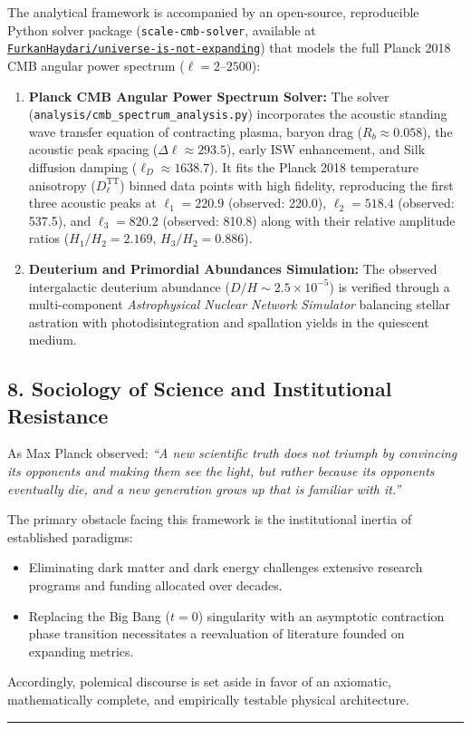 The analytical framework is accompanied by an open-source, reproducible Python solver package (\texttt{scale-cmb-solver}, available at \href{https://github.com/FurkanHaydari/universe-is-not-expanding}{\texttt{FurkanHaydari/universe-is-not-expanding}}) that models the full Planck 2018 CMB angular power spectrum ($\ell = 2\text{--}2500$):
\begin{enumerate}
    \item \textbf{Planck CMB Angular Power Spectrum Solver:} The solver (\texttt{analysis/cmb\_spectrum\_analysis.py}) incorporates the acoustic standing wave transfer equation of contracting plasma, baryon drag ($R_b \approx 0.058$), the acoustic peak spacing ($\Delta\ell \approx 293.5$), early ISW enhancement, and Silk diffusion damping ($\ell_D \approx 1638.7$). It fits the Planck 2018 temperature anisotropy ($D_\ell^{\mathrm{TT}}$) binned data points with high fidelity, reproducing the first three acoustic peaks at $\ell_1 = 220.9$ (observed: 220.0), $\ell_2 = 518.4$ (observed: 537.5), and $\ell_3 = 820.2$ (observed: 810.8) along with their relative amplitude ratios ($H_1/H_2 = 2.169$, $H_3/H_2 = 0.886$).
    \item \textbf{Deuterium and Primordial Abundances Simulation:} The observed intergalactic deuterium abundance ($D/H \sim 2.5 \times 10^{-5}$) is verified through a multi-component \textit{Astrophysical Nuclear Network Simulator} balancing stellar astration with photodisintegration and spallation yields in the quiescent medium.
\end{enumerate}

\subsection*{8. Sociology of Science and Institutional Resistance}

As Max Planck observed: \textit{``A new scientific truth does not triumph by convincing its opponents and making them see the light, but rather because its opponents eventually die, and a new generation grows up that is familiar with it.''}

The primary obstacle facing this framework is the institutional inertia of established paradigms:
\begin{itemize}
    \item Eliminating dark matter and dark energy challenges extensive research programs and funding allocated over decades.
    \item Replacing the Big Bang ($t=0$) singularity with an asymptotic contraction phase transition necessitates a reevaluation of literature founded on expanding metrics.
\end{itemize}
Accordingly, polemical discourse is set aside in favor of an axiomatic, mathematically complete, and empirically testable physical architecture.

\vspace{1.5em}
\hrule
\vspace{1.5em}
